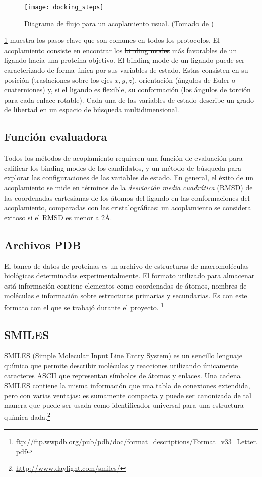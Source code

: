 \begin{figure}[h]
  \texttt{[image: docking\_steps]}
  \caption{Diagrama de flujo para un acoplamiento usual.
    (Tomado de \cite{kukol})}
  \label{fig:docking_flowchart}
\end{figure}
\ref{fig:docking_flowchart} muestra los pasos clave que son comunes en
todos los protocolos. El acoplamiento consiste en encontrar los
\sout{binding modes} más favorables de un ligando hacia una proteína
objetivo. El \sout{binding mode} de un ligando puede ser caracterizado
de forma única por sus variables de estado. Estas consisten en su
posición (traslaciones sobre los ejes $x, y, z$), orientación (ángulos
de Euler o cuaterniones) y, si el ligando es flexible, su conformación
(los ángulos de torción para cada enlace \sout{rotable}). Cada una de
las variables de estado describe un grado de libertad en un espacio de
búsqueda multidimensional.

\subsection{Función evaluadora}
Todos los métodos de acoplamiento requieren una función de evaluación
para calificar los \sout{binding modes} de los candidatos, y un método
de búsqueda para explorar las configuraciones de las variables de
estado. En general, el éxito de un acoplamiento se mide en términos de
la \textit{desviación media cuadrática} (RMSD) de las coordenadas
cartesianas de los átomos del ligando en las conformaciones del
acoplamiento, comparadas con las cristalográficas: un acoplamiento se
considera exitoso si el RMSD es menor a 2\AA.

\subsection{Archivos PDB}
El banco de datos de proteínas es un archivo de estructuras de macromoléculas
biológicas determinadas experimentalmente. El formato utilizado para almacenar
está información contiene elementos como coordenadas de átomos, nombres de
moléculas e información sobre estructuras primarias y secundarias. Es con este
formato con el que se trabajó durante el proyecto.
\footnote{\url{ftp://ftp.wwpdb.org/pub/pdb/doc/format_descriptions/Format_v33_Letter.pdf}}

\subsection{SMILES}
SMILES (Simple Molecular Input Line Entry System) es un sencillo lenguaje
químico que permite describir moléculas y reacciones utilizando únicamente
caracteres ASCII que representan símbolos de átomos y enlaces. Una cadena SMILES
contiene la misma información que una tabla de conexiones extendida, pero con
varias ventajas: es sumamente compacta y puede ser canonizada de tal manera
que puede ser usada como identificador universal para una estructura química
dada.\footnote{\url{http://www.daylight.com/smiles/}}
